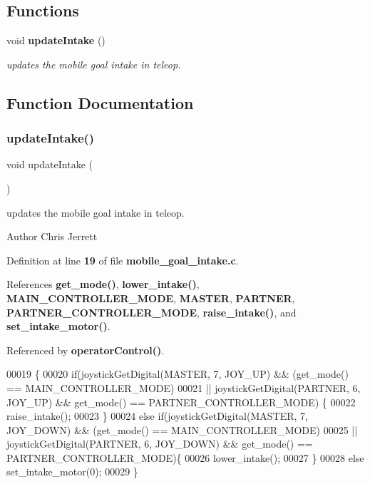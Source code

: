 \subsection*{Functions}
\begin{DoxyCompactItemize}
\item 
void \textbf{ update\+Intake} ()
\begin{DoxyCompactList}\small\item\em updates the mobile goal intake in teleop. \end{DoxyCompactList}\end{DoxyCompactItemize}


\subsection{Function Documentation}
\mbox{\label{mobile__goal__intake_8h_ad0232c21c5c1ffda603d2b7d61034118}} 
\subsubsection{update\+Intake()}
{\footnotesize\ttfamily void update\+Intake (\begin{DoxyParamCaption}{ }\end{DoxyParamCaption})}



updates the mobile goal intake in teleop. 

\begin{DoxyAuthor}{Author}
Chris Jerrett 
\end{DoxyAuthor}


Definition at line \textbf{ 19} of file \textbf{ mobile\+\_\+goal\+\_\+intake.\+c}.



References \textbf{ get\+\_\+mode()}, \textbf{ lower\+\_\+intake()}, \textbf{ M\+A\+I\+N\+\_\+\+C\+O\+N\+T\+R\+O\+L\+L\+E\+R\+\_\+\+M\+O\+DE}, \textbf{ M\+A\+S\+T\+ER}, \textbf{ P\+A\+R\+T\+N\+ER}, \textbf{ P\+A\+R\+T\+N\+E\+R\+\_\+\+C\+O\+N\+T\+R\+O\+L\+L\+E\+R\+\_\+\+M\+O\+DE}, \textbf{ raise\+\_\+intake()}, and \textbf{ set\+\_\+intake\+\_\+motor()}.



Referenced by \textbf{ operator\+Control()}.


\begin{DoxyCode}
00019                     \{
00020   \textcolor{keywordflow}{if}(joystickGetDigital(MASTER, 7, JOY\_UP) && (get_mode() == 
      MAIN_CONTROLLER_MODE)
00021   || joystickGetDigital(PARTNER, 6, JOY\_UP) && get_mode() == 
      PARTNER_CONTROLLER_MODE) \{
00022     raise_intake();
00023   \}
00024   \textcolor{keywordflow}{else} \textcolor{keywordflow}{if}(joystickGetDigital(MASTER, 7, JOY\_DOWN) && (get_mode() == 
      MAIN_CONTROLLER_MODE)
00025   || joystickGetDigital(PARTNER, 6, JOY\_DOWN) && get_mode() == 
      PARTNER_CONTROLLER_MODE)\{
00026     lower_intake();
00027   \}
00028   \textcolor{keywordflow}{else} set_intake_motor(0);
00029 \}
\end{DoxyCode}
